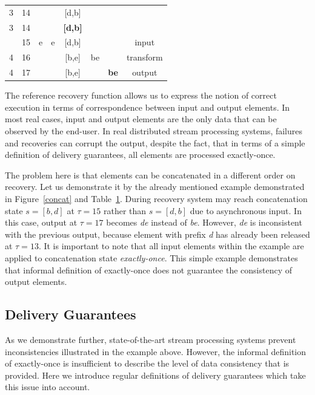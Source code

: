 \begin{table}[!b]
\begin {center}
\begin{tabular}{c|l|c|c|c|c|c|c}
3   &   14   &       &               &   [d,b]         &       &           &    \\
3   &   14   &       &               &   {\bf [d,b]}   &       &           &    \\
\arrayrulecolor{red}\hline
4   &   15   &  e    &   e           &   [d,b]   &      &           &   input \\
4   &   16   &       &              &   [b,e]   &   be    &          &   transform \\
4   &   17   &       &              &   [b,e]   &       &   {\bf be}       &   output \\
\end{tabular}
\label{concat_example}
\end {center}
\end{table}

The reference recovery function allows us to express the notion of correct execution in terms of correspondence between input and output elements. In most real cases, input and output elements are the only data that can be observed by the end-user. In real distributed stream processing systems, failures and recoveries can corrupt the output, despite the fact, that in terms of a simple definition of delivery guarantees, all elements are processed exactly-once. 

The problem here is that elements can be concatenated in a different order on recovery. Let us demonstrate it by the already mentioned example demonstrated in Figure~\ref{concat} and Table~\ref{concat_example}. During recovery system may reach concatenation state $s=[b,d]$ at $\tau=15$ rather than $s=[d,b]$ due to asynchronous input. In this case, output at $\tau=17$ becomes {\em de} instead of {\em be}. However, {\em de} is inconsistent with the previous output, because element with prefix {\em d} has already been released at $\tau=13$. It is important to note that all input elements within the example are applied to concatenation state {\em  exactly-once}. This simple example demonstrates that informal definition of exactly-once does not guarantee the consistency of output elements.

\subsection{Delivery Guarantees}

As we demonstrate further, state-of-the-art stream processing systems prevent inconsistencies illustrated in the example above. However, the informal definition of exactly-once is insufficient to describe the level of data consistency that is provided. Here we introduce regular definitions of delivery guarantees which take this issue into account. 

